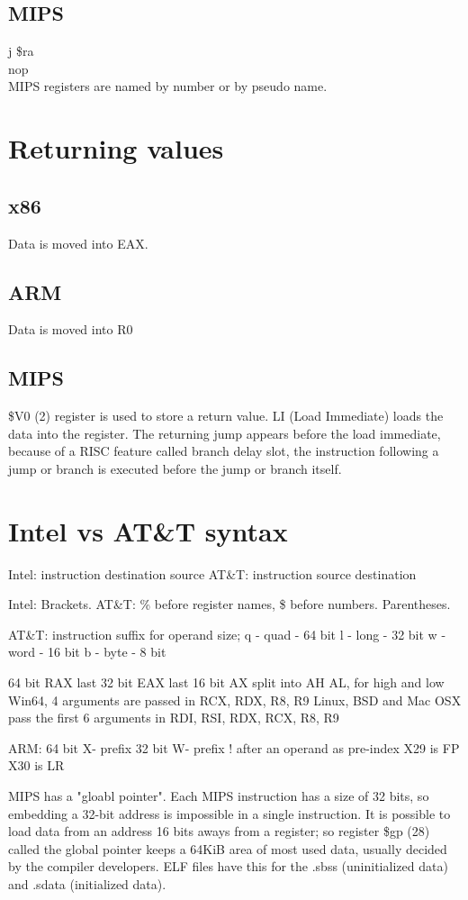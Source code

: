 \documentclass[11pt, a4paper, draft]{article}
\begin{document}
		\subsection*{MIPS}
		j \$ra\\
		nop\\
		MIPS registers are named by number or by pseudo name.
	
	\section*{Returning values}
		\subsection*{x86}
		Data is moved into EAX.
		\subsection*{ARM}
		Data is moved into R0
		\subsection*{MIPS}
		\$V0 (2) register is used to store a return value. LI (Load Immediate) loads the data into the register.
		The returning jump appears before the load immediate, because of a RISC feature called branch delay slot, the instruction following a jump or branch is executed before the jump or branch itself.
	
	\section*{Intel vs AT\&T syntax}
	Intel: instruction destination source
	AT\&T: instruction source destination
	
	Intel: Brackets.
	AT\&T: \% before register names, \$ before numbers. Parentheses.
	
	AT\&T: instruction suffix for operand size;
	q - quad - 64 bit
	l - long - 32 bit
	w - word - 16 bit
	b - byte - 8 bit
	
	64 bit RAX
	last 32 bit EAX
	last 16 bit AX
	split into AH AL, for high and low
	Win64, 4 arguments are passed in RCX, RDX, R8, R9
	Linux, BSD and Mac OSX pass the first 6 arguments in RDI, RSI, RDX, RCX, R8, R9
	
	ARM: 64 bit X- prefix
	32 bit W- prefix
	! after an operand as pre-index
	X29 is FP
	X30 is LR
	
	
	
	MIPS has a "gloabl pointer". Each MIPS instruction has a size of 32 bits, so embedding a 32-bit address is impossible in a single instruction. It is possible to load data from an address 16 bits aways from a register; so register \$gp (28) called the global pointer keeps a 64KiB area of most used data, usually decided by the compiler developers. ELF files have this for the .sbss (uninitialized data) and .sdata (initialized data).
	
\end{document}
